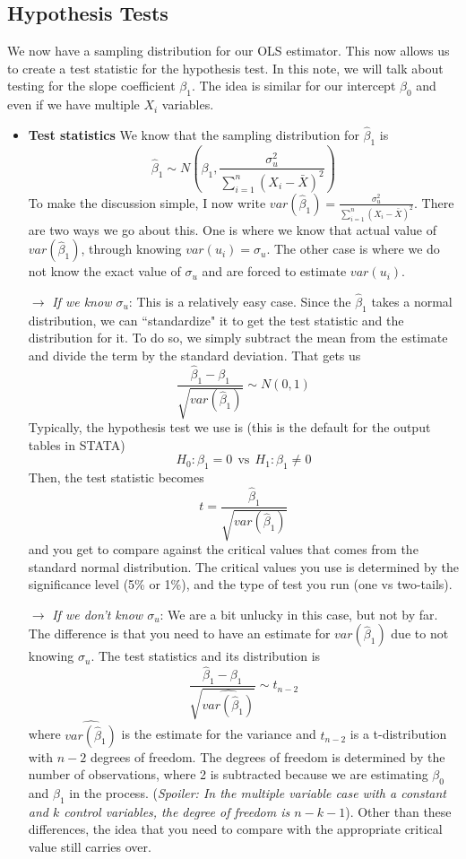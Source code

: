 \documentclass[12pt]{article}
\theoremstyle{definition}
\theoremstyle{property}
\theoremstyle{assumption}
\theoremstyle{example}
\theoremstyle{comment}
\begin{document}
\subsection{Hypothesis Tests}
We now have a sampling distribution for our OLS estimator. This now allows us to create a test statistic for the hypothesis test. In this note, we will talk about testing for the slope coefficient $\beta_1$. The idea is similar for our intercept $\beta_0$ and even if we have multiple $X_i$ variables. 
\begin{itemize}
\item\textbf{Test statistics} We know that the sampling distribution for $\hat{\beta}_1$ is
\[
\hat{\beta}_1 \sim N\left(\beta_1, \frac{\sigma_u^2}{\sum_{i=1}^n(X_i-\bar{X})^2}\right)
\]
To make the discussion simple, I now write $var(\hat{\beta}_1)=\frac{\sigma_u^2}{\sum_{i=1}^n(X_i-\bar{X})^2}$. There are two ways we go about this. One is where we know that actual value of $var(\hat{\beta}_1)$, through knowing $var(u_i)=\sigma_u$. The other case is where we do not know the exact value of $\sigma_u$ and are forced to estimate $var(u_i)$.
\item[$\to$] \textit{If we know $\sigma_u$}: This is a relatively easy case. Since the $\hat{\beta}_1$ takes a normal distribution, we can ``standardize" it to get the test statistic and the distribution for it. To do so, we simply subtract the mean from the estimate and divide the term by the standard deviation. That gets us
\[
\frac{\hat{\beta}_1-\beta_1}{\sqrt{var(\hat{\beta}_1)}}\sim N(0,1)
\]
Typically, the hypothesis test we use is (this is the default for the output tables in STATA)
\[
H_0: \beta_1=0 \ \ \text{vs} \ \ H_1: \beta_1\neq0
\]
Then, the test statistic becomes 
\[
t=\frac{\hat{\beta}_1}{\sqrt{var(\hat{\beta}_1)}}
\]
and you get to compare against the critical values that comes from the standard normal distribution. The critical values you use is determined by the significance level (5\% or 1\%), and the type of test you run (one vs two-tails).
\item[$\to$] \textit{If we don't know $\sigma_u$}: We are a bit unlucky in this case, but not by far. The difference is that you need to have an estimate for $var(\hat{\beta}_1)$ due to not knowing $\sigma_u$. The test statistics and its distribution is
\[
\frac{\hat{\beta}_1-\beta_1}{\sqrt{\widehat{var(\hat{\beta}_1)}}}\sim t_{n-2}
\]
where $\widehat{var(\hat{\beta}_1)}$ is the estimate for the variance and $t_{n-2}$ is a t-distribution with $n-2$ degrees of freedom. The degrees of freedom is determined by the number of observations, where 2 is subtracted because we are estimating $\beta_0$ and $\beta_1$ in the process. (\textit{Spoiler: In the multiple variable case with a constant and $k$ control variables, the degree of freedom is $n-k-1$}). Other than these differences, the idea that you need to compare with the appropriate critical value still carries over. \par\medskip

\end{itemize}
\end{document}
